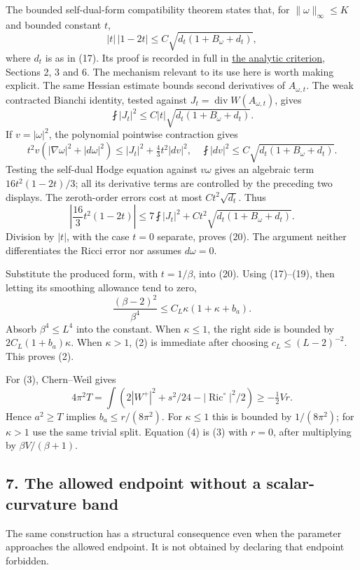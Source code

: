 \documentclass[
  10pt,
]{article}
\begin{document}
The bounded self-dual-form compatibility theorem states that, for
\(\|\omega\|_\infty\le K\) and bounded constant \(t\), \[
|t|\,|1-2t|
\le C\sqrt{d_t(1+B_\omega+d_t)},
\tag{20}
\] where \(d_t\) is as in (17). Its proof is recorded in full in
\href{round21_analytic.md}{the analytic criterion}, Sections 2, 3 and 6.
The mechanism relevant to its use here is worth making explicit. The
same Hessian estimate bounds second derivatives of \(A_{\omega,t}\). The
weak contracted Bianchi identity, tested against
\(J_t=\operatorname{div}W(A_{\omega,t})\), gives \[
\fint|J_t|^2\le C|t|\sqrt{d_t(1+B_\omega+d_t)}.
\] If \(v=|\omega|^2\), the polynomial pointwise contraction gives \[
t^2v(|\nabla\omega|^2+|d\omega|^2)
\le |J_t|^2+\tfrac43t^2|dv|^2,
\quad
\fint|dv|^2\le C\sqrt{d_t(1+B_\omega+d_t)}.
\] Testing the self-dual Hodge equation against \(v\omega\) gives an
algebraic term \(16t^2(1-2t)/3\); all its derivative terms are
controlled by the preceding two displays. The zeroth-order errors cost
at most \(Ct^2\sqrt{d_t}\). Thus \[
\left|\frac{16}{3}t^2(1-2t)\right|
\le7\fint|J_t|^2+C t^2\sqrt{d_t(1+B_\omega+d_t)}.
\] Division by \(|t|\), with the case \(t=0\) separate, proves (20). The
argument neither differentiates the Ricci error nor assumes
\(d\omega=0\).

Substitute the produced form, with \(t=1/\beta\), into (20). Using
(17)--(19), then letting its smoothing allowance tend to zero, \[
\frac{(\beta-2)^2}{\beta^4}
\le C_L\kappa(1+\kappa+b_a).
\tag{21}
\] Absorb \(\beta^4\le L^4\) into the constant. When \(\kappa\le1\), the
right side is bounded by \(2C_L(1+b_a)\kappa\). When \(\kappa>1\), (2)
is immediate after choosing \(c_L\le(L-2)^{-2}\). This proves (2).

For (3), Chern--Weil gives \[
4\pi^2T=\int\left(2|W^+|^2+s^2/24
-|\operatorname{Ric}^{\circ}|^2/2\right)
\ge-\tfrac12 Vr.
\] Hence \(a^2\ge T\) implies \(b_a\le r/(8\pi^2)\). For \(\kappa\le1\)
this is bounded by \(1/(8\pi^2)\); for \(\kappa>1\) use the same trivial
split. Equation (4) is (3) with \(r=0\), after multiplying by
\(\beta V/(\beta+1)\).

\hypertarget{the-allowed-endpoint-without-a-scalar-curvature-band}{%
\subsection{7. The allowed endpoint without a scalar-curvature
band}\label{the-allowed-endpoint-without-a-scalar-curvature-band}}

The same construction has a structural consequence even when the
parameter approaches the allowed endpoint. It is not obtained by
declaring that endpoint forbidden.
\end{document}
